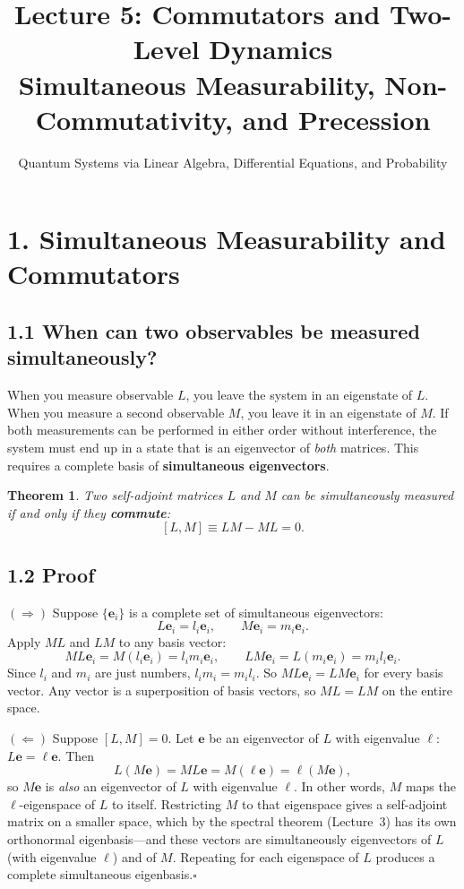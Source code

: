 \documentclass[12pt,a4paper]{article}
\title{\textbf{Lecture 5: Commutators and Two-Level Dynamics} \\ \large Simultaneous Measurability, Non-Commutativity, and Precession}
\author{Quantum Systems via Linear Algebra, Differential Equations, and Probability}
\date{}
\newtheorem{theorem}{Theorem}
\begin{document}
\maketitle
\thispagestyle{fancy}

\section{1. Simultaneous Measurability and Commutators}

\subsection{1.1 When can two observables be measured simultaneously?}

When you measure observable $L$, you leave the system in an eigenstate of $L$.  When you measure a second observable $M$, you leave it in an eigenstate of $M$.  If both measurements can be performed in either order without interference, the system must end up in a state that is an eigenvector of \emph{both} matrices.  This requires a complete basis of \textbf{simultaneous eigenvectors}.

\begin{theorem}
Two self-adjoint matrices $L$ and $M$ can be simultaneously measured if and only if they \textbf{commute}:
\[
    \boxed{[L,M] \equiv LM - ML = 0.}
\]
\end{theorem}

\subsection{1.2 Proof}
$(\Rightarrow)$ Suppose $\{\mathbf{e}_i\}$ is a complete set of simultaneous eigenvectors:
\[
    L\mathbf{e}_i = l_i\mathbf{e}_i, \qquad M\mathbf{e}_i = m_i\mathbf{e}_i.
\]
Apply $ML$ and $LM$ to any basis vector:
\[
    ML\mathbf{e}_i = M(l_i\mathbf{e}_i) = l_i m_i\mathbf{e}_i, \qquad
    LM\mathbf{e}_i = L(m_i\mathbf{e}_i) = m_i l_i\mathbf{e}_i.
\]
Since $l_i$ and $m_i$ are just numbers, $l_i m_i = m_i l_i$.  So $ML\mathbf{e}_i=LM\mathbf{e}_i$ for every basis vector.  Any vector is a superposition of basis vectors, so $ML=LM$ on the entire space.

\medskip
\noindent$(\Leftarrow)$ Suppose $[L,M]=0$.  Let $\mathbf{e}$ be an eigenvector of $L$ with eigenvalue $\ell$: $L\mathbf{e}=\ell\mathbf{e}$.  Then
\[
    L(M\mathbf{e}) = ML\mathbf{e} = M(\ell\mathbf{e}) = \ell(M\mathbf{e}),
\]
so $M\mathbf{e}$ is \emph{also} an eigenvector of $L$ with eigenvalue $\ell$.  In other words, $M$ maps the $\ell$-eigenspace of $L$ to itself.  Restricting $M$ to that eigenspace gives a self-adjoint matrix on a smaller space, which by the spectral theorem (Lecture~3) has its own orthonormal eigenbasis---and these vectors are simultaneously eigenvectors of $L$ (with eigenvalue $\ell$) and of $M$.  Repeating for each eigenspace of $L$ produces a complete simultaneous eigenbasis.\;$\square$
\end{document}
